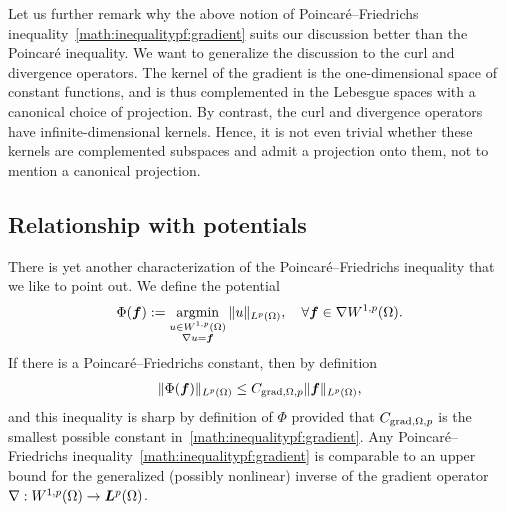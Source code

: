 \documentclass[10pt,a4paper]{article}
\begin{document}
\begin{remark}
    Let us further remark why the above notion of Poincar\'e--Friedrichs inequality~\eqref{math:inequalitypf:gradient} suits our discussion better than the Poincar\'e inequality. 
    We want to generalize the discussion to the curl and divergence operators. 
    The kernel of the gradient is the one-dimensional space of constant functions, and is thus complemented in the Lebesgue spaces with a canonical choice of projection. 
    By contrast, the curl and divergence operators have infinite-dimensional kernels. 
    Hence, it is not even trivial whether these kernels are complemented subspaces and admit a projection onto them, not to mention a canonical projection. 
\end{remark}





\subsection{Relationship with potentials}

There is yet another characterization of the Poincar\'e--Friedrichs inequality that we like to point out. 
We define the potential 
\begin{align*}
    \Phi( \bm{f} ) := \operatorname*{{\rm argmin}}\limits_{ \substack{ u \in W^{1,p}(\Omega) \\ \nabla u = \bm{f} } } \| u \|_{L^{p}(\Omega)},
    \quad 
    \forall 
    \bm{f} \in \nabla W^{1,p}(\Omega)
    .
\end{align*}
If there is a Poincar\'e--Friedrichs constant, then by definition
\begin{align*}
    \| \Phi(\bm{f}) \|_{L^{p}(\Omega)} \leq C_{\operatorname{grad},\Omega,p} \| \bm{f} \|_{L^{p}(\Omega)},
\end{align*}
and this inequality is sharp by definition of $\Phi$ provided that $C_{\operatorname{grad},\Omega,p}$ is the smallest possible constant in~\eqref{math:inequalitypf:gradient}. 
Any Poincar\'e--Friedrichs inequality~\eqref{math:inequalitypf:gradient} is comparable to an upper bound for the generalized (possibly nonlinear) inverse of the gradient operator $\nabla : W^{1,p}(\Omega) \rightarrow \bm{L}^{p}(\Omega)$. 
\end{document}
